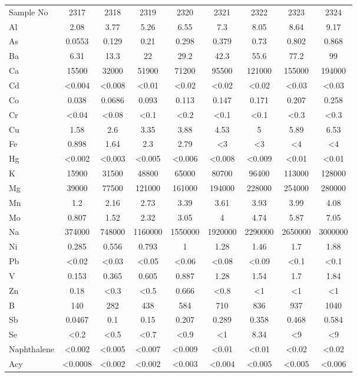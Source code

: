 \documentclass[algorithms,article,submit,pdftex,moreauthors]{Definitions/mdpi}
\begin{document}
\begin{scriptsize}
\begin{center}
\begin{longtable}{@{\extracolsep{\fill}}|p{1.8cm}|cccccccc|@{}}
Sample No & 2317 & 2318 & 2319 & 2320 & 2321 & 2322 & 2323 & 2324  \\
Al & 2.08 & 3.77 & 5.26 & 6.55 & 7.3 & 8.05 & 8.64 & 9.17 \\
As & 0.0553 & 0.129 & 0.21 & 0.298 & 0.379 & 0.73 & 0.802 & 0.868 \\
Ba & 6.31 & 13.3 & 22 & 29.2 & 42.3 & 55.6 & 77.2 & 99 \\
Ca & 15500 & 32000 & 51900 & 71200 & 95500 & 121000 & 155000 & 194000 \\
Cd & <0.004 & <0.008 & <0.01 & <0.02 & <0.02 & <0.02 & <0.03 & <0.03 \\
Co & 0.038 & 0.0686 & 0.093 & 0.113 & 0.147 & 0.171 & 0.207 & 0.258 \\
Cr & <0.04 & <0.08 & <0.1 & <0.2 & <0.1 & <0.1 & <0.3 & <0.3 \\
Cu & 1.58 & 2.6 & 3.35 & 3.88 & 4.53 & 5 & 5.89 & 6.53 \\
Fe & 0.898 & 1.64 & 2.3 & 2.79 & <3 & <3 & <4 & <4 \\
Hg & <0.002 &  <0.003 & <0.005 &  <0.006 & <0.008 & <0.009 & <0.01 & <0.01 \\
K & 15900 & 31500 & 48800 & 65000 & 80700 & 96400 & 113000 & 128000 \\
Mg & 39000 & 77500 & 121000 & 161000 & 194000 & 228000 & 254000 & 280000 \\
Mn & 1.2 & 2.16 & 2.73 & 3.39 & 3.61 & 3.93 & 3.99 & 4.08  \\
Mo & 0.807 & 1.52 & 2.32 & 3.05 & 4 & 4.74 & 5.87 & 7.05  \\
Na & 374000 & 748000 & 1160000 & 1550000 & 1920000 & 2290000 & 2650000 & 3000000 \\
Ni & 0.285 & 0.556 & 0.793 & 1 & 1.28 & 1.46 & 1.7 & 1.88 \\
Pb & <0.02 & <0.03 & <0.05 & <0.06 & <0.08 & <0.09 & <0.1 & <0.1 \\
V & 0.153 & 0.365 & 0.605 & 0.887 & 1.28 & 1.54 & 1.7 & 1.84 \\
Zn & 0.18 & <0.3 & <0.5 & 0.666 & <0.8 & <1 & <1 & <1 \\
B & 140 & 282 & 438 & 584 & 710 & 836 & 937 & 1040 \\
Sb & 0.0467 & 0.1 & 0.15 & 0.207 & 0.289 & 0.358 & 0.468 & 0.584 \\
Se & <0.2 & <0.5 & <0.7 & <0.9 & <1 & 8.34 & <9 & <9 \\
Naphthalene & <0.002 & <0.005 & <0.007 & <0.009 & <0.01 & <0.01 & <0.02 & <0.02 \\
Acy & <0.0008 & <0.002 & <0.002 & <0.003 & <0.004 & <0.005 & <0.005 & <0.006 \\

\end{longtable}
\end{center}
\end{scriptsize}
\end{document}
